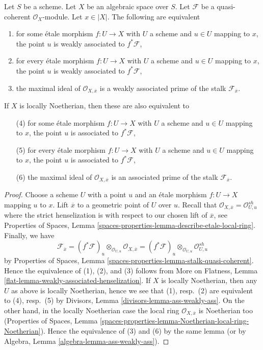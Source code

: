 \begin{lemma}
\label{lemma-associated}
Let $S$ be a scheme. Let $X$ be an algebraic space over $S$.
Let $\mathcal{F}$ be a quasi-coherent $\mathcal{O}_X$-module.
Let $x \in |X|$. The following are equivalent
\begin{enumerate}
\item for some \'etale morphism $f : U \to X$ with $U$ a scheme
and $u \in U$ mapping to $x$, the point $u$ is weakly associated
to $f^*\mathcal{F}$,
\item for every \'etale morphism $f : U \to X$ with $U$ a scheme
and $u \in U$ mapping to $x$, the point $u$ is weakly associated
to $f^*\mathcal{F}$,
\item the maximal ideal of $\mathcal{O}_{X, \overline{x}}$
is a weakly associated prime of the stalk $\mathcal{F}_{\overline{x}}$.
\end{enumerate}
If $X$ is locally Noetherian, then these are also equivalent to
\begin{enumerate}
\item[(4)] for some \'etale morphism $f : U \to X$ with $U$ a scheme
and $u \in U$ mapping to $x$, the point $u$ is associated
to $f^*\mathcal{F}$,
\item[(5)] for every \'etale morphism $f : U \to X$ with $U$ a scheme
and $u \in U$ mapping to $x$, the point $u$ is associated
to $f^*\mathcal{F}$,
\item[(6)] the maximal ideal of $\mathcal{O}_{X, \overline{x}}$
is an associated prime of the stalk $\mathcal{F}_{\overline{x}}$.
\end{enumerate}
\end{lemma}

\begin{proof}
Choose a scheme $U$ with a point $u$ and an \'etale morphism
$f : U \to X$ mapping $u$ to $x$. Lift $\overline{x}$ to a geometric
point of $U$ over $u$. Recall that
$\mathcal{O}_{X, \overline{x}} = \mathcal{O}_{U, u}^{sh}$
where the strict henselization is with respect to our chosen
lift of $\overline{x}$, see
Properties of Spaces, Lemma
\ref{spaces-properties-lemma-describe-etale-local-ring}.
Finally, we have
$$
\mathcal{F}_{\overline{x}} =
(f^*\mathcal{F})_u \otimes_{\mathcal{O}_{U, u}}
\mathcal{O}_{X, \overline{x}} =
(f^*\mathcal{F})_u \otimes_{\mathcal{O}_{U, u}}
\mathcal{O}_{U, u}^{sh}
$$
by
Properties of Spaces, Lemma \ref{spaces-properties-lemma-stalk-quasi-coherent}.
Hence the equivalence of (1), (2), and (3) follows from
More on Flatness, Lemma \ref{flat-lemma-weakly-associated-henselization}.
If $X$ is locally Noetherian, then
any $U$ as above is locally Noetherian,
hence we see that (1), resp.\ (2) are equivalent to (4), resp.\ (5) by
Divisors, Lemma \ref{divisors-lemma-ass-weakly-ass}.
On the other hand, in the locally Noetherian case the
local ring $\mathcal{O}_{X, \overline{x}}$ is Noetherian too
(Properties of Spaces, Lemma
\ref{spaces-properties-lemma-Noetherian-local-ring-Noetherian}).
Hence the equivalence of (3) and (6) by the same lemma
(or by Algebra, Lemma \ref{algebra-lemma-ass-weakly-ass}).
\end{proof}

